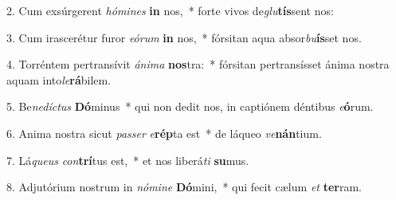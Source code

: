 2. Cum exsúrgerent \textit{hó}\textit{mi}\textit{nes} \textbf{in} nos,~*  forte vivos de\textit{glu}\textbf{tís}sent nos:\

3. Cum irascerétur furor \textit{e}\textit{ó}\textit{rum} \textbf{in} nos,~*  fórsitan aqua absor\textit{bu}\textbf{ís}set nos.\

4. Torréntem pertransívit \textit{á}\textit{ni}\textit{ma} \textbf{nos}tra:~*  fórsitan pertransísset ánima nostra aquam into\textit{le}\textbf{rá}bilem.\

5. Be\textit{ne}\textit{díc}\textit{tus} \textbf{Dó}minus~*  qui non dedit nos, in captiónem déntibus \textit{e}\textbf{ó}rum.\

6. Anima nostra sicut \textit{pas}\textit{ser} \textit{e}\textbf{rép}ta est~*  de láqueo \textit{ve}\textbf{nán}tium.\

7. Lá\textit{que}\textit{us} \textit{con}\textbf{trí}tus est,~*  et nos liberá\textit{ti} \textbf{su}mus.\

8. Adjutórium nostrum in \textit{nó}\textit{mi}\textit{ne} \textbf{Dó}mini,~*  qui fecit cælum \textit{et} \textbf{ter}ram.\

